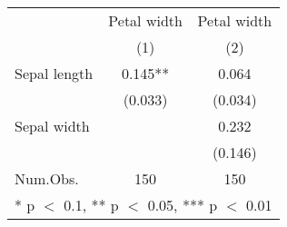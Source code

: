 \begin{table}
\centering
\begin{tabular}[t]{lcc}
\toprule
  & Petal width & Petal width \\
& (1) & (2)\\
\midrule
Sepal length & 0.145** & 0.064\\
 & (0.033) & (0.034)\\
Sepal width &  & 0.232\\
 &  & (0.146)\\
\midrule
Num.Obs. & 150 & 150\\
\bottomrule
\multicolumn{3}{l}{\rule{0pt}{1em}* p $<$ 0.1, ** p $<$ 0.05, *** p $<$ 0.01}\\
\end{tabular}
\end{table}
